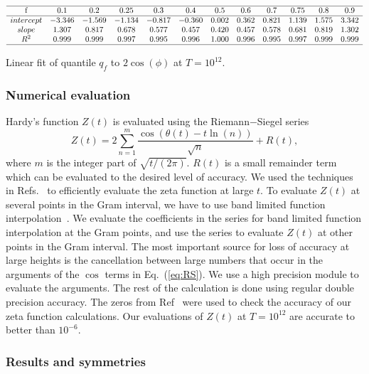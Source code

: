 \documentclass[twoside]{article}
\begin{document}
\begin{table}
\centering \(\begin{array}{cccccccccccc}
\hline
$f$&0.1&0.2&0.25&0.3&0.4&0.5&0.6&0.7&0.75&0.8&0.9\\
\hline
intercept&-3.346&-1.569&-1.134&-0.817&-0.360&0.002&0.362&0.821&1.139&1.575&3.342\\
slope&1.307&0.817&0.678&0.577&0.457&0.420&0.457&0.578&0.681&0.819&1.302\\
R^2&0.999&0.999&0.997&0.995&0.996&1.000&0.996&0.995&0.997&0.999&0.999\\
\hline
\end{array}\)
\caption{Linear fit of quantile $q_f$ to $2\cos(\phi)$ at $T=10^{12}$.}
\label{tab:fit12}
\end{table}

\subsubsection{\label{numerics}Numerical evaluation}

Hardy's function $Z(t)$  is evaluated using the Riemann$-$Siegel series
\begin{equation}
Z(t) = 2\sum^{m}_{n=1}\frac{\cos(\theta(t) - t \ln (n))}{\sqrt{n}} + R(t), 
\label{eq:RS}
\end{equation}
where $m$ is the integer part of $\sqrt{t/(2\pi)}$. $R(t)$ is a small remainder
term which can be evaluated to the desired level of accuracy. We used the techniques in Refs.~\cite{Odlyzko 1992,hiary,gourdon} 
to efficiently evaluate the zeta function at large $t$. To evaluate  $Z(t)$  at several points in the Gram interval, we have to use band limited function interpolation~\cite{Jerri 1977}. We evaluate the coefficients in the series for band limited function interpolation at the Gram points, and use the series to evaluate $Z(t)$ at other points in the Gram interval. The most important 
source for loss of accuracy at large heights is the cancellation between
large numbers that occur in the arguments of the $\cos$ terms in Eq.~(\ref{eq:RS}). We 
use a high precision module to evaluate the arguments. The rest of the calculation
is done using regular double precision accuracy. The  zeros from Ref~\cite{hiary 2010} were used to check the accuracy of our zeta function calculations. Our evaluations of $Z(t)$ at $T=10^{12}$ are accurate to better than $10^{-6}$. 

\subsubsection{\label{discusssionE12}Results and symmetries}
\end{document}
